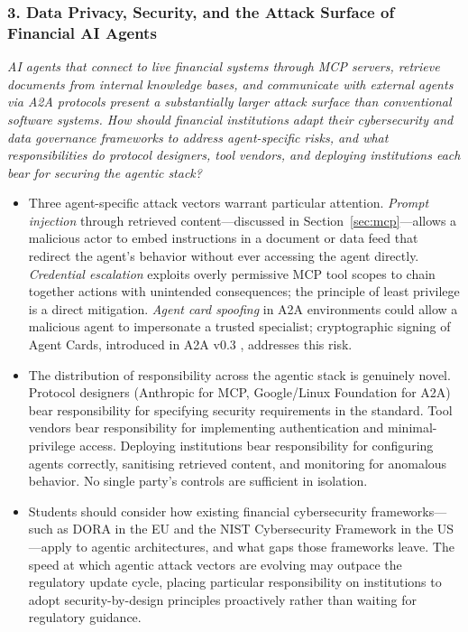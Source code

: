 \documentclass{article}
\begin{document}
\subsubsection*{3. Data Privacy, Security, and the Attack Surface of Financial AI Agents}
\textit{AI agents that connect to live financial systems through MCP servers, retrieve documents from internal knowledge bases, and communicate with external agents via A2A protocols present a substantially larger attack surface than conventional software systems. How should financial institutions adapt their cybersecurity and data governance frameworks to address agent-specific risks, and what responsibilities do protocol designers, tool vendors, and deploying institutions each bear for securing the agentic stack?}
\begin{itemize}
    \item Three agent-specific attack vectors warrant particular attention. \textit{Prompt injection} through retrieved content---discussed in Section~\ref{sec:mcp}---allows a malicious actor to embed instructions in a document or data feed that redirect the agent's behavior without ever accessing the agent directly. \textit{Credential escalation} exploits overly permissive MCP tool scopes to chain together actions with unintended consequences; the principle of least privilege is a direct mitigation. \textit{Agent card spoofing} in A2A environments could allow a malicious agent to impersonate a trusted specialist; cryptographic signing of Agent Cards, introduced in A2A v0.3 \cite{google_a2a_v03_2025}, addresses this risk.
    \item The distribution of responsibility across the agentic stack is genuinely novel. Protocol designers (Anthropic for MCP, Google/Linux Foundation for A2A) bear responsibility for specifying security requirements in the standard. Tool vendors bear responsibility for implementing authentication and minimal-privilege access. Deploying institutions bear responsibility for configuring agents correctly, sanitising retrieved content, and monitoring for anomalous behavior. No single party's controls are sufficient in isolation.
    \item Students should consider how existing financial cybersecurity frameworks---such as DORA in the EU and the NIST Cybersecurity Framework in the US---apply to agentic architectures, and what gaps those frameworks leave. The speed at which agentic attack vectors are evolving may outpace the regulatory update cycle, placing particular responsibility on institutions to adopt security-by-design principles proactively rather than waiting for regulatory guidance.
\end{itemize}
\end{document}
